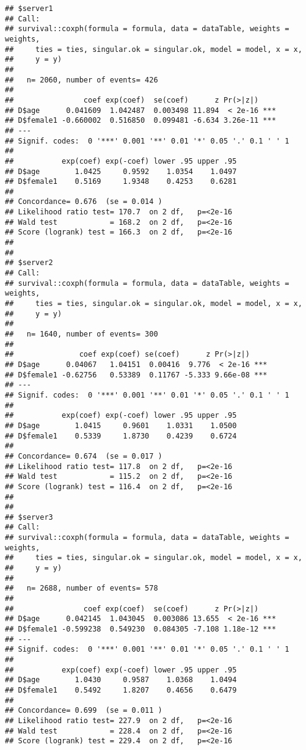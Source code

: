 \documentclass[
]{book}
\begin{document}
\begin{verbatim}
## $server1
## Call:
## survival::coxph(formula = formula, data = dataTable, weights = weights, 
##     ties = ties, singular.ok = singular.ok, model = model, x = x, 
##     y = y)
## 
##   n= 2060, number of events= 426 
## 
##                coef exp(coef)  se(coef)      z Pr(>|z|)    
## D$age      0.041609  1.042487  0.003498 11.894  < 2e-16 ***
## D$female1 -0.660002  0.516850  0.099481 -6.634 3.26e-11 ***
## ---
## Signif. codes:  0 '***' 0.001 '**' 0.01 '*' 0.05 '.' 0.1 ' ' 1
## 
##           exp(coef) exp(-coef) lower .95 upper .95
## D$age        1.0425     0.9592    1.0354    1.0497
## D$female1    0.5169     1.9348    0.4253    0.6281
## 
## Concordance= 0.676  (se = 0.014 )
## Likelihood ratio test= 170.7  on 2 df,   p=<2e-16
## Wald test            = 168.2  on 2 df,   p=<2e-16
## Score (logrank) test = 166.3  on 2 df,   p=<2e-16
## 
## 
## $server2
## Call:
## survival::coxph(formula = formula, data = dataTable, weights = weights, 
##     ties = ties, singular.ok = singular.ok, model = model, x = x, 
##     y = y)
## 
##   n= 1640, number of events= 300 
## 
##               coef exp(coef) se(coef)      z Pr(>|z|)    
## D$age      0.04067   1.04151  0.00416  9.776  < 2e-16 ***
## D$female1 -0.62756   0.53389  0.11767 -5.333 9.66e-08 ***
## ---
## Signif. codes:  0 '***' 0.001 '**' 0.01 '*' 0.05 '.' 0.1 ' ' 1
## 
##           exp(coef) exp(-coef) lower .95 upper .95
## D$age        1.0415     0.9601    1.0331    1.0500
## D$female1    0.5339     1.8730    0.4239    0.6724
## 
## Concordance= 0.674  (se = 0.017 )
## Likelihood ratio test= 117.8  on 2 df,   p=<2e-16
## Wald test            = 115.2  on 2 df,   p=<2e-16
## Score (logrank) test = 116.4  on 2 df,   p=<2e-16
## 
## 
## $server3
## Call:
## survival::coxph(formula = formula, data = dataTable, weights = weights, 
##     ties = ties, singular.ok = singular.ok, model = model, x = x, 
##     y = y)
## 
##   n= 2688, number of events= 578 
## 
##                coef exp(coef)  se(coef)      z Pr(>|z|)    
## D$age      0.042145  1.043045  0.003086 13.655  < 2e-16 ***
## D$female1 -0.599238  0.549230  0.084305 -7.108 1.18e-12 ***
## ---
## Signif. codes:  0 '***' 0.001 '**' 0.01 '*' 0.05 '.' 0.1 ' ' 1
## 
##           exp(coef) exp(-coef) lower .95 upper .95
## D$age        1.0430     0.9587    1.0368    1.0494
## D$female1    0.5492     1.8207    0.4656    0.6479
## 
## Concordance= 0.699  (se = 0.011 )
## Likelihood ratio test= 227.9  on 2 df,   p=<2e-16
## Wald test            = 228.4  on 2 df,   p=<2e-16
## Score (logrank) test = 229.4  on 2 df,   p=<2e-16
\end{verbatim}
\end{document}
